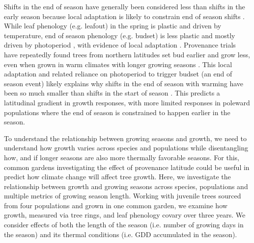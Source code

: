 \documentclass{article}\usepackage[]{graphicx}\usepackage[]{xcolor}
\begin{document}
Shifts in the end of season have generally been considered less than shifts in the early season because local adaptation is likely to constrain end of season shifts  \citep{wolkovich_why_2025,soolanayakanahally_timing_2013}. While leaf phenology (e.g. leafout) in the spring is plastic and driven by temperature, end of season phenology (e.g. budset) is less plastic and mostly driven by photoperiod \citep{baumgarten_indeterminacy_2026,singh_photoperiod_2017}, with evidence of local adaptation \citep{zeng_weak_2024}. Provenance trials have repeatedly found trees from northern latitudes set bud earlier and grow less, even when grown in warm climates with longer growing seasons \citep{aitken_time_2016,way_photoperiod_2015}. This local adaptation and related reliance on photoperiod to trigger budset (an end of season event) likely explains why shifts in the end of season with warming have been so much smaller than shifts in the start of season \citep{piao_plant_2019}. This predicts a latitudinal gradient in growth responses, with more limited responses in poleward populations where the end of season is constrained to happen earlier in the season.

To understand the relationship between growing seasons and growth, we need to understand how growth varies across species and populations while disentangling how, and if longer seasons are also more thermally favorable seasons. For this, common gardens investigating the effect of provenance latitude could be useful in predict how climate change will affect tree growth. Here, we investigate the relationship between growth and growing seasons across species, populations and multiple metrics of growing season length. Working with juvenile trees sourced from four populations and grown in one common garden, we examine how growth, measured via tree rings, and leaf phenology covary over three years. We consider effects of both the length of the season (i.e. number of growing days in the season) and its thermal conditions (i.e. GDD accumulated in the season). 
\end{document}

